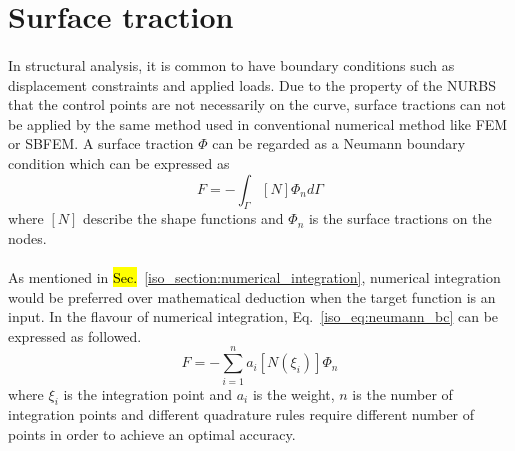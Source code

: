 \section{Surface traction}
\label{iso_section:surface_traction}
\paragraph{}
In structural analysis, it is common to have boundary conditions such as displacement constraints and applied loads.
Due to the property of the NURBS that the control points are not necessarily on the curve, surface tractions can not be applied by the same method used in conventional numerical method like FEM or SBFEM.
A surface traction $\Phi$ can be regarded as a Neumann boundary condition which can be expressed as
    \begin{equation}
        {F}=-\int_{\Gamma}
        [N]
        \Phi_n
        d\Gamma
    \label{iso_eq:neumann_bc}
    \end{equation}
where $[N]$ describe the shape functions and $\Phi_n$ is the surface tractions on the nodes.

\paragraph{}
As mentioned in \hl{Sec.}~\ref{iso_section:numerical_integration}, numerical integration would be preferred over mathematical deduction when the target function is an input.
In the flavour of numerical integration, Eq.~\ref{iso_eq:neumann_bc} can be expressed as followed.
    \begin{equation}
        {F}=-\sum_{i=1}^n
        a_i
        [N(\xi_i)]
        \Phi_n
    \label{iso_eq:neumann_bc_numerical}
    \end{equation}
where $\xi_i$ is the integration point and $a_i$ is the weight,
$n$ is the number of integration points and different quadrature rules require different number of points in order to achieve an optimal accuracy.

